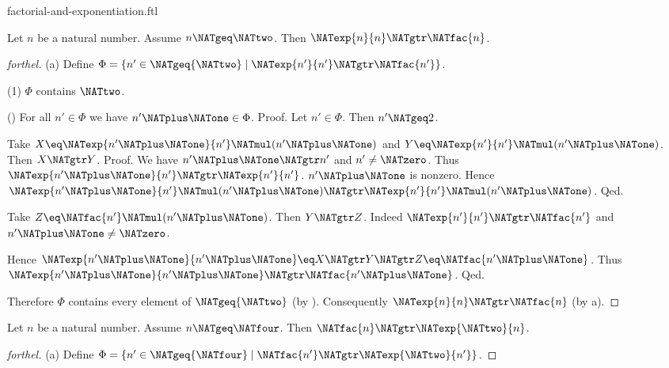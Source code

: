 \documentclass{naproche-library}
\begin{document}
\begin{smodule}[title=Factorial and Exponentiation]{factorial-and-exponentiation.ftl}

\begin{proposition}[forthel,id=ARITHMETIC_12_8113296594960384]
  Let $n$ be a natural number.
  Assume $n \NATgeq \NATtwo$.
  Then $\NATexp{n}{n} \NATgtr \NATfac{n}$.
\end{proposition}
\begin{proof}[forthel]
  (a) Define $\Phi = \{ n' \in \NATgeq{\NATtwo} \mid \NATexp{n'}{n'} \NATgtr \NATfac{n'} \}$.

  (1) $\Phi$ contains $\NATtwo$.

  (\NATtwo) For all $n' \in \Phi$ we have $n' \NATplus \NATone \in \Phi$. \newline
  Proof.
    Let $n' \in \Phi$.
    Then $n' \NATgeq 2$.

    Take $X \eq \NATexp{n' \NATplus \NATone}{n'} \NATmul (n' \NATplus \NATone)$ and $Y \eq \NATexp{n'}{n'} \NATmul (n' \NATplus \NATone)$.
    Then $X \NATgtr Y$. \newline
    Proof.
      We have $n' \NATplus \NATone \NATgtr n'$ and $n' \neq \NATzero$.
      Thus $\NATexp{n' \NATplus \NATone}{n'} \NATgtr \NATexp{n'}{n'}$.
      $n' \NATplus \NATone$ is nonzero.
      Hence $\NATexp{n' \NATplus \NATone}{n'} \NATmul (n' \NATplus \NATone) \NATgtr \NATexp{n'}{n'} \NATmul (n' \NATplus \NATone)$.
    Qed.

    Take $Z \eq \NATfac{n'} \NATmul (n' \NATplus \NATone)$.
    Then $Y \NATgtr Z$.
    Indeed $\NATexp{n'}{n'} \NATgtr \NATfac{n'}$ and $n' \NATplus \NATone \neq \NATzero$.

    Hence $\NATexp{n' \NATplus \NATone}{n' \NATplus \NATone} \eq X \NATgtr Y \NATgtr Z \eq \NATfac{n' \NATplus \NATone}$.
    Thus $\NATexp{n' \NATplus \NATone}{n' \NATplus \NATone} \NATgtr \NATfac{n' \NATplus \NATone}$.
  Qed.

  Therefore $\Phi$ contains every element of $\NATgeq{\NATtwo}$ (by ).
  Consequently $\NATexp{n}{n} \NATgtr \NATfac{n}$ (by a).
\end{proof}

\begin{proposition}[forthel,id=ARITHMETIC_12_5413271156817920]
  Let $n$ be a natural number.
  Assume $n \NATgeq \NATfour$.
  Then $\NATfac{n} \NATgtr \NATexp{\NATtwo}{n}$.
\end{proposition}
\begin{proof}[forthel]
  (a) Define $\Phi = \{ n' \in \NATgeq{\NATfour} \mid \NATfac{n'} \NATgtr \NATexp{\NATtwo}{n'} \}$.


\end{proof}
\end{smodule}
\end{document}
